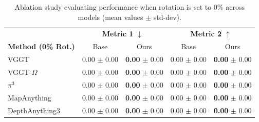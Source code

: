 \begin{table}[ht]
\centering
\caption{Ablation study evaluating performance when rotation is set to 0\% across models (mean values $\pm$ std-dev).}
\label{tab:ablation_rotation_0}
\small
\renewcommand{\arraystretch}{1.2}
\setlength{\tabcolsep}{6pt}

\begin{tabular}{l cc cc}
\toprule
& \multicolumn{2}{c}{\textbf{Metric 1} $\downarrow$} & \multicolumn{2}{c}{\textbf{Metric 2} $\uparrow$} \\
\cmidrule(lr){2-3} \cmidrule(lr){4-5}
\textbf{Method (0\% Rot.)} & Base & Ours & Base & Ours \\
\midrule

VGGT 
& \makecell{0.00 \\ {\tiny $\pm$ 0.00}} & \makecell{\textbf{0.00} \\ {\tiny $\pm$ 0.00}} 
& \makecell{0.00 \\ {\tiny $\pm$ 0.00}} & \makecell{\textbf{0.00} \\ {\tiny $\pm$ 0.00}} \\
\addlinespace[3pt]

VGGT-$\Omega$ 
& \makecell{0.00 \\ {\tiny $\pm$ 0.00}} & \makecell{\textbf{0.00} \\ {\tiny $\pm$ 0.00}} 
& \makecell{0.00 \\ {\tiny $\pm$ 0.00}} & \makecell{\textbf{0.00} \\ {\tiny $\pm$ 0.00}} \\
\addlinespace[3pt]

$\pi^3$ 
& \makecell{0.00 \\ {\tiny $\pm$ 0.00}} & \makecell{\textbf{0.00} \\ {\tiny $\pm$ 0.00}} 
& \makecell{0.00 \\ {\tiny $\pm$ 0.00}} & \makecell{\textbf{0.00} \\ {\tiny $\pm$ 0.00}} \\
\addlinespace[3pt]

MapAnything 
& \makecell{0.00 \\ {\tiny $\pm$ 0.00}} & \makecell{\textbf{0.00} \\ {\tiny $\pm$ 0.00}} 
& \makecell{0.00 \\ {\tiny $\pm$ 0.00}} & \makecell{\textbf{0.00} \\ {\tiny $\pm$ 0.00}} \\
\addlinespace[3pt]

DepthAnything3 
& \makecell{0.00 \\ {\tiny $\pm$ 0.00}} & \makecell{\textbf{0.00} \\ {\tiny $\pm$ 0.00}} 
& \makecell{0.00 \\ {\tiny $\pm$ 0.00}} & \makecell{\textbf{0.00} \\ {\tiny $\pm$ 0.00}} \\

\bottomrule
\end{tabular}
\end{table}